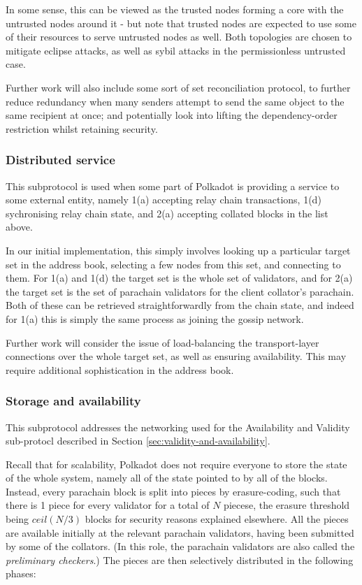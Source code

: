 In some sense, this can be viewed as the trusted nodes forming a core with the untrusted nodes around it - but note that trusted nodes are expected to use some of their resources to serve untrusted nodes as well. Both topologies are chosen to mitigate eclipse attacks, as well as sybil attacks in the permissionless untrusted case.

Further work will also include some sort of set reconciliation protocol, to further reduce redundancy when many senders attempt to send the same object to the same recipient at once; and potentially look into lifting the dependency-order restriction whilst retaining security.

\subsubsection{Distributed service} \label{sec:net_service}

This subprotocol is used when some part of Polkadot is providing a service to some external entity, namely 1(a) accepting relay chain transactions, 1(d) sychronising relay chain state, and 2(a) accepting collated blocks in the list above.

In our initial implementation, this simply involves looking up a particular target set in the address book, selecting a few nodes from this set, and connecting to them. For 1(a) and 1(d) the target set is the whole set of validators, and for 2(a) the target set is the set of parachain validators for the client collator's parachain. Both of these can be retrieved straightforwardly from the chain state, and indeed for 1(a) this is simply the same process as joining the gossip network.

Further work will consider the issue of load-balancing the transport-layer connections over the whole target set, as well as ensuring availability. This may require additional sophistication in the address book.

\subsubsection{Storage and availability} \label{sec:net_storage}

This subprotocol addresses the networking used for the Availability and Validity sub-protocl described in Section \ref{sec:validity-and-availability}.

Recall that for scalability, Polkadot does not require everyone to store the state of the whole system, namely all of the state pointed to by all of the blocks. Instead, every parachain block is split into pieces by erasure-coding, such that there is 1 piece for every validator for a total of $N$ piecese, the erasure threshold being $ceil(N/3)$ blocks for security reasons explained elsewhere. All the pieces are available initially at the relevant parachain validators, having been submitted by some of the collators. (In this role, the parachain validators are also called the \emph{preliminary checkers}.) The pieces are then selectively distributed in the following phases:

